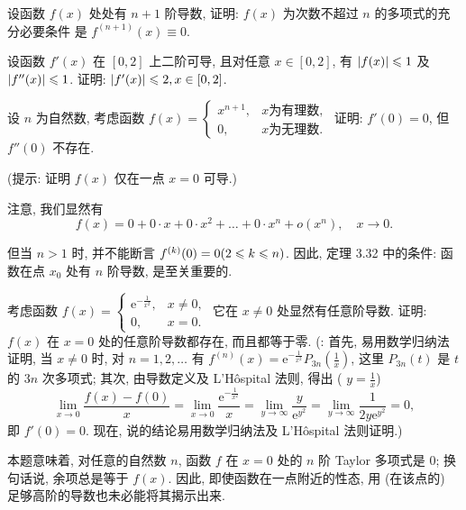 \begin{exercise}[3.6.7]
    设函数 $f(x)$ 处处有 $n + 1$ 阶导数, 证明: $f(x)$ 为次数不超过 $n$ 的多项式的充分必要条件 是 $f^{(n+1)}(x) \equiv 0$.
\end{exercise}

\begin{exercise}[3.6.8]
    设函数 $f'(x)$ 在 $[0, 2]$ 上二阶可导, 且对任意 $x \in [0, 2]$, 有 $|f(x)| \leqslant 1$ 及 $|f''(x)| \leqslant 1$. 证明: $|f'(x)| \leqslant 2, x \in [0, 2]$.
\end{exercise}

\begin{exercise}[3.6.9]
    设 $n$ 为自然数, 考虑函数 $f(x) = \begin{cases} x^{n+1}, & x \text{为有理数}, \\ 0, & x \text{为无理数}. \end{cases}$ 证明: $f'(0) = 0$, 但 $f''(0)$ 不存在.

    (提示: 证明 $f(x)$ 仅在一点 $x=0$ 可导.)

    注意, 我们显然有
    $$f(x) = 0 + 0 \cdot x + 0 \cdot x^2 + \dots + 0 \cdot x^n + o(x^n), \quad x \to 0.$$

    但当 $n > 1$ 时, 并不能断言 $f^{(k)}(0) = 0 (2 \leqslant k \leqslant n)$. 因此, 定理 3.32 中的条件: 函数在点 $x_0$ 处有 $n$ 阶导数, 是至关重要的.
\end{exercise}

\begin{exercise}[3.6.10]
    考虑函数 $f(x) = \begin{cases} \mathrm{e}^{-\frac{1}{x^2}}, & x \ne 0, \\ 0, & x = 0. \end{cases}$ 它在 $x \ne 0$ 处显然有任意阶导数. 证明: $f(x)$ 在 $x=0$ 处的任意阶导数都存在, 而且都等于零.
    (: 首先, 易用数学归纳法证明, 当 $x \ne 0$ 时, 对 $n=1, 2, \dots$ 有 $f^{(n)}(x) = \mathrm{e}^{-\frac{1}{x^2}} P_{3n}(\frac{1}{x})$, 这里 $P_{3n}(t)$ 是 $t$ 的 $3n$ 次多项式; 其次, 由导数定义及 L'Hôspital 法则, 得出 ( $y = \frac{1}{x}$)
    $$\lim_{x \to 0} \frac{f(x) - f(0)}{x} = \lim_{x \to 0} \frac{\mathrm{e}^{-\frac{1}{x^2}}}{x} = \lim_{y \to \infty} \frac{y}{\mathrm{e}^{y^2}} = \lim_{y \to \infty} \frac{1}{2y \mathrm{e}^{y^2}} = 0,$$
    即 $f'(0) = 0$. 现在, 说的结论易用数学归纳法及 L'Hôspital 法则证明.)

    本题意味着, 对任意的自然数 $n$, 函数 $f$ 在 $x=0$ 处的 $n$ 阶 Taylor 多项式是 $0$; 换句话说, 余项总是等于 $f(x)$. 因此, 即使函数在一点附近的性态, 用 (在该点的) 足够高阶的导数也未必能将其揭示出来.
\end{exercise}

